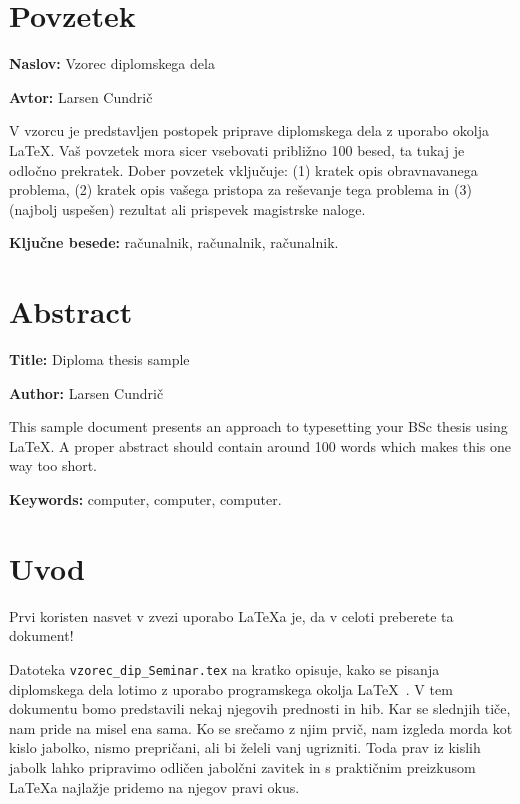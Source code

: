 \documentclass[a4paper, 12pt]{book}
\newcommand{\ttitle}{Vzorec diplomskega dela}
\newcommand{\ttitleEn}{Diploma thesis sample}
\newcommand{\tauthor}{Larsen Cundrič}
\newcommand{\tkeywords}{računalnik, računalnik, računalnik}
\newcommand{\tkeywordsEn}{computer, computer, computer}
\newcommand{\clearemptydoublepage}{\newpage{\pagestyle{empty}\cleardoublepage}}
\begin{document}
\clearemptydoublepage

\chapter*{Povzetek}

\noindent\textbf{Naslov:} \ttitle
\bigskip

\noindent\textbf{Avtor:} \tauthor
\bigskip

\noindent V vzorcu je predstavljen postopek priprave diplomskega dela z uporabo okolja \LaTeX. Vaš povzetek mora sicer vsebovati približno 100 besed, ta tukaj je odločno prekratek.
Dober povzetek vključuje: (1) kratek opis obravnavanega problema, (2) kratek opis vašega pristopa za reševanje tega problema in (3) (najbolj uspešen) rezultat ali prispevek magistrske naloge.

\bigskip

\noindent\textbf{Ključne besede:} \tkeywords.
\clearemptydoublepage

\chapter*{Abstract}

\noindent\textbf{Title:} \ttitleEn
\bigskip

\noindent\textbf{Author:} \tauthor
\bigskip

\noindent This sample document presents an approach to typesetting your BSc thesis using \LaTeX. 
A proper abstract should contain around 100 words which makes this one way too short.
\bigskip

\noindent\textbf{Keywords:} \tkeywordsEn.
\clearemptydoublepage

\mainmatter
\setcounter{page}{1}
\pagestyle{fancy}

\chapter{Uvod}
Prvi koristen nasvet v zvezi uporabo \LaTeX{a} je, da v celoti preberete ta dokument!

Datoteka {\tt vzorec\_dip\_Seminar.tex} na kratko opisuje, kako se pisanja diplomskega dela lotimo z uporabo programskega okolja \LaTeX~\cite{lamport,nenajkrajsi}. 
V tem dokumentu bomo predstavili nekaj njegovih prednosti in hib. 
Kar se slednjih tiče, nam pride na misel ena sama. 
Ko se srečamo z njim prvič, nam izgleda morda kot kislo jabolko, nismo prepričani, ali bi želeli vanj ugrizniti. 
Toda prav iz kislih jabolk lahko pripravimo odličen jabolčni zavitek in s praktičnim preizkusom \LaTeX a najlažje pridemo na njegov pravi okus.
\end{document}
